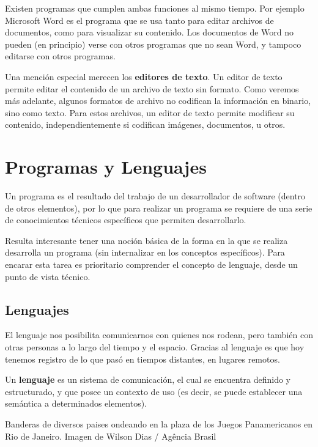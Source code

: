 Existen programas que cumplen ambas funciones al mismo tiempo. Por ejemplo
Microsoft Word es el programa que se usa tanto para editar archivos de
documentos, como para visualizar su contenido. Los documentos de Word no pueden
(en principio) verse con otros programas que no sean Word, y tampoco editarse
con otros programas.

Una mención especial merecen los \textbf{editores de texto}. Un editor de texto
permite editar el contenido de un archivo de texto sin formato. Como veremos más
adelante, algunos formatos de archivo no codifican la información en binario,
sino como texto. Para estos archivos, un editor de texto permite modificar su
contenido, independientemente si codifican imágenes, documentos, u otros.

\section{Programas y Lenguajes}
\label{chap:informatica:sec:programas}

Un programa es el resultado del trabajo de un desarrollador de software (dentro
de otros elementos), por lo que para realizar un programa se requiere de una
serie de conocimientos técnicos específicos que permiten desarrollarlo.

Resulta interesante tener una noción básica de la forma en la que se realiza
desarrolla un programa (sin internalizar en los conceptos específicos). Para
encarar esta tarea es prioritario comprender el concepto de lenguaje, desde un
punto de vista técnico.

\subsection{Lenguajes}
\label{chap:informatica:subsec:lenguajes}

El lenguaje nos posibilita comunicarnos con quienes nos rodean, pero también con
otras personas a lo largo del tiempo y el espacio. Gracias al lenguaje es que
hoy tenemos registro de lo que pasó en tiempos distantes, en lugares remotos.

\begin{definition}
    Un \textbf{lenguaje} es un sistema de comunicación, el cual se encuentra
    definido y estructurado, y que posee un contexto de uso (es decir, se puede
    establecer una semántica a determinados elementos).
\end{definition}

{Banderas de diversos paises ondeando en la plaza de los Juegos Panamericanos en
Rio de Janeiro.} {Imagen de Wilson Dias / Ag\^encia Brasil}

